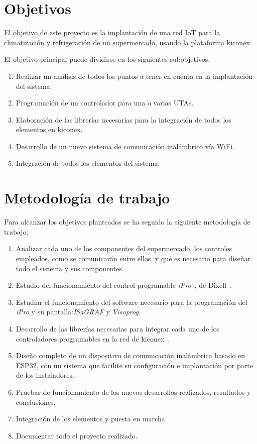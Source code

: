 \section{Objetivos}
\label{sec:objetivos}

El objetivo de este proyecto es la implantación de una red IoT para la climatización y refrigeración de un supermercado, usando la plataforma kiconex.

El objetivo principal puede dividirse en los siguientes subobjetivos:

\begin{enumerate}
  \item Realizar un análisis de todos los puntos a tener en cuenta en la implantación del sistema.
  \item Programación de un controlador para una o varias UTAs.
  \item Elaboración de las librerías necesarias para la integración de todos los elementos en kiconex.
  \item Desarrollo de un nuevo sistema de comunicación inalámbrico vía WiFi.
  \item Integración de todos los elementos del sistema.
\end{enumerate}

\section{Metodología de trabajo}
\label{sec:metodologia}

Para alcanzar los objetivos planteados se ha seguido la siguiente metodología de trabajo:

\begin{enumerate}
\item Analizar cada uno de los componentes del supermercado, los controles empleados, como se comunicarán entre ellos, y qué es necesario para diseñar todo el sistema y sus componentes.
\item Estudio del funcionamiento del control programable \textit{iPro}~\cite{iproManual}, de Dixell~\cite{marcaDixell}.
\item Estudiar el funcionamiento del software necesario para la programación del \textit{iPro} y su pantalla:\textit{ISaGRAF} y \textit{Visoprog}.
\item Desarrollo de las librerías necesarias para integrar cada uno de los controladores programables en la red de kiconex~\cite{queEsKiconex}.
\item Diseño completo de un dispositivo de comunicación inalámbrica basado en ESP32, con un sistema que facilite su configuración e implantación por parte de los instaladores.
\item Pruebas de funcionamiento de los nuevos desarrollos realizados, resultados y conclusiones.
\item Integración de los elementos y puesta en marcha.
\item Documentar todo el proyecto realizado.
\end{enumerate}



